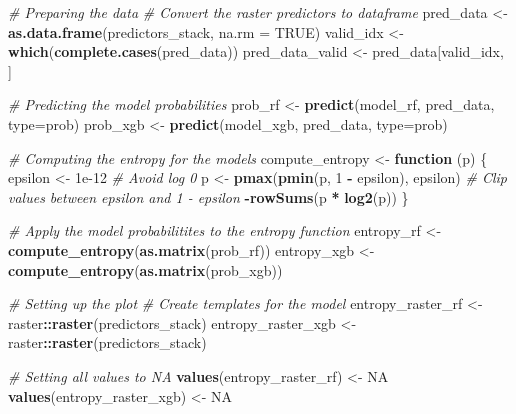 \documentclass[
]{article}
\newenvironment{Shaded}{\begin{snugshade}}{\end{snugshade}}
\newcommand{\AttributeTok}[1]{\textcolor[rgb]{0.13,0.29,0.53}{#1}}
\newcommand{\CommentTok}[1]{\textcolor[rgb]{0.56,0.35,0.01}{\textit{#1}}}
\newcommand{\ConstantTok}[1]{\textcolor[rgb]{0.56,0.35,0.01}{#1}}
\newcommand{\ControlFlowTok}[1]{\textcolor[rgb]{0.13,0.29,0.53}{\textbf{#1}}}
\newcommand{\DecValTok}[1]{\textcolor[rgb]{0.00,0.00,0.81}{#1}}
\newcommand{\FloatTok}[1]{\textcolor[rgb]{0.00,0.00,0.81}{#1}}
\newcommand{\FunctionTok}[1]{\textcolor[rgb]{0.13,0.29,0.53}{\textbf{#1}}}
\newcommand{\NormalTok}[1]{#1}
\newcommand{\OtherTok}[1]{\textcolor[rgb]{0.56,0.35,0.01}{#1}}
\newcommand{\SpecialCharTok}[1]{\textcolor[rgb]{0.81,0.36,0.00}{\textbf{#1}}}
\newcommand{\StringTok}[1]{\textcolor[rgb]{0.31,0.60,0.02}{#1}}
\begin{document}
\begin{Shaded}
\begin{Highlighting}[]
\CommentTok{\# Preparing the data}
\CommentTok{\# Convert the raster predictors to dataframe}
\NormalTok{pred\_data }\OtherTok{\textless{}{-}} \FunctionTok{as.data.frame}\NormalTok{(predictors\_stack, }\AttributeTok{na.rm =} \ConstantTok{TRUE}\NormalTok{)}
\NormalTok{valid\_idx }\OtherTok{\textless{}{-}} \FunctionTok{which}\NormalTok{(}\FunctionTok{complete.cases}\NormalTok{(pred\_data))}
\NormalTok{pred\_data\_valid }\OtherTok{\textless{}{-}}\NormalTok{ pred\_data[valid\_idx, ]}

\CommentTok{\# Predicting the model probabilities}
\NormalTok{prob\_rf }\OtherTok{\textless{}{-}} \FunctionTok{predict}\NormalTok{(model\_rf, pred\_data, }\AttributeTok{type=}\StringTok{\textquotesingle{}prob\textquotesingle{}}\NormalTok{)}
\NormalTok{prob\_xgb }\OtherTok{\textless{}{-}} \FunctionTok{predict}\NormalTok{(model\_xgb, pred\_data, }\AttributeTok{type=}\StringTok{\textquotesingle{}prob\textquotesingle{}}\NormalTok{)}

\CommentTok{\# Computing the entropy for the models}
\NormalTok{compute\_entropy }\OtherTok{\textless{}{-}} \ControlFlowTok{function}\NormalTok{ (p) \{}
\NormalTok{  epsilon }\OtherTok{\textless{}{-}} \FloatTok{1e{-}12} \CommentTok{\# Avoid log 0}
\NormalTok{  p }\OtherTok{\textless{}{-}} \FunctionTok{pmax}\NormalTok{(}\FunctionTok{pmin}\NormalTok{(p, }\DecValTok{1} \SpecialCharTok{{-}}\NormalTok{ epsilon), epsilon)  }\CommentTok{\# Clip values between epsilon and 1 {-} epsilon}
  \SpecialCharTok{{-}}\FunctionTok{rowSums}\NormalTok{(p }\SpecialCharTok{*} \FunctionTok{log2}\NormalTok{(p))}
\NormalTok{\}}

\CommentTok{\# Apply the model probabilitites to the entropy function}
\NormalTok{entropy\_rf }\OtherTok{\textless{}{-}} \FunctionTok{compute\_entropy}\NormalTok{(}\FunctionTok{as.matrix}\NormalTok{(prob\_rf))}
\NormalTok{entropy\_xgb }\OtherTok{\textless{}{-}} \FunctionTok{compute\_entropy}\NormalTok{(}\FunctionTok{as.matrix}\NormalTok{(prob\_xgb))}

\CommentTok{\# Setting up the plot}
\CommentTok{\# Create templates for the model}
\NormalTok{entropy\_raster\_rf }\OtherTok{\textless{}{-}}\NormalTok{ raster}\SpecialCharTok{::}\FunctionTok{raster}\NormalTok{(predictors\_stack)}
\NormalTok{entropy\_raster\_xgb }\OtherTok{\textless{}{-}}\NormalTok{ raster}\SpecialCharTok{::}\FunctionTok{raster}\NormalTok{(predictors\_stack)}

\CommentTok{\# Setting all values to NA}
\FunctionTok{values}\NormalTok{(entropy\_raster\_rf) }\OtherTok{\textless{}{-}} \ConstantTok{NA}
\FunctionTok{values}\NormalTok{(entropy\_raster\_xgb) }\OtherTok{\textless{}{-}} \ConstantTok{NA}


\end{Highlighting}
\end{Shaded}
\end{document}

